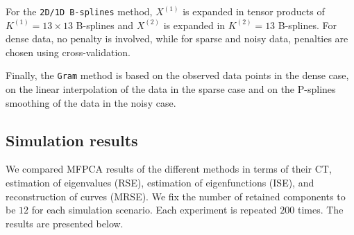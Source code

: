 \documentclass[times,sort&compress,3p]{elsarticle}
\theoremstyle{plain}%
\theoremstyle{definition}
\newcounter{scenario}[section]
\begin{document}
For the \texttt{2D/1D B-splines} method, $X^{(1)}$ is expanded in tensor products of $K^{(1)} = 13 \times 13$ B-splines and $X^{(2)}$ is expanded in $K^{(2)} = 13$ B-splines. For dense data, no penalty is involved, while for sparse and noisy data, penalties are chosen using cross-validation.

Finally, the \texttt{Gram} method is based on the observed data points in the dense case, on the linear interpolation of the data in the sparse case \citep{benkoCommonFunctionalPrincipal2009} and on the P-splines smoothing of the data in the noisy case.



\subsection{Simulation results} %
\label{sub:simulation_results}

We compared MFPCA results of the different methods in terms of their CT, estimation of eigenvalues (RSE), estimation of eigenfunctions (ISE), and reconstruction of curves (MRSE). We fix the number of retained components to be $12$ for each simulation scenario. Each experiment is repeated $200$ times. The results are presented below.
\end{document}
